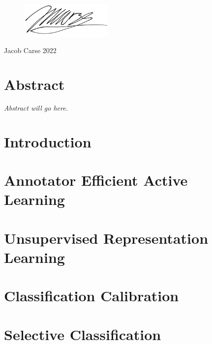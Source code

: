 \documentclass[12pt]{report}
\begin{document}
	\vspace{30pt}
	\begin{flushright}
		\begin{figure}[h]
			\begin{flushright}
				\includegraphics[width=0.4\textwidth]{images/signature.png}
			\end{flushright}
		\end{figure}
	
		Jacob Carse
		2022
	
	\end{flushright}

	\newpage
	\chapter*{Abstract}
	\textit{Abstract will go here.}

	
	\newpage
	\chapter{Introduction}
	\label{ch:introduction}
	
	
	
	\chapter{Annotator Efficient Active Learning}
	\label{ch:active_learning}
	
	
	
	\chapter{Unsupervised Representation Learning}
	\label{ch:unsupervised_representation_learning}
	
	
	
	\chapter{Classification Calibration}
	\label{ch:classification_claibration}
	
	
	
	\chapter{Selective Classification}
	\label{ch:selective_classification}
	
	
\end{document}
